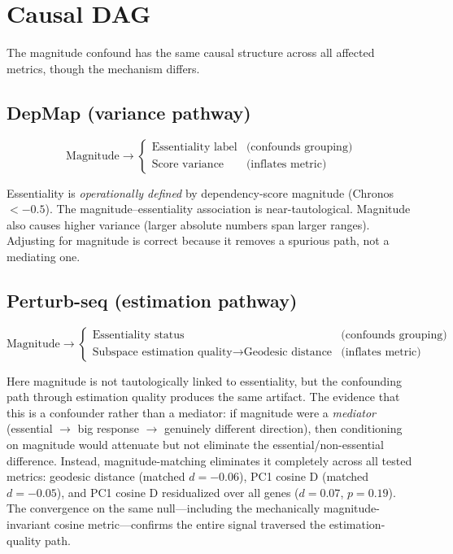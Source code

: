 \documentclass[11pt]{article}
\begin{document}
\section{Causal DAG}
\label{sec:dag}

The magnitude confound has the same causal structure across all
affected metrics, though the mechanism differs.

\subsection{DepMap (variance pathway)}

\begin{equation*}
\text{Magnitude} \rightarrow
\begin{cases}
\text{Essentiality label} & \text{(confounds grouping)} \\
\text{Score variance} & \text{(inflates metric)}
\end{cases}
\end{equation*}

Essentiality is \emph{operationally defined} by dependency-score
magnitude (Chronos $< -0.5$). The magnitude--essentiality association is
near-tautological. Magnitude also causes higher variance (larger
absolute numbers span larger ranges). Adjusting for magnitude is correct
because it removes a spurious path, not a mediating one.

\subsection{Perturb-seq (estimation pathway)}

\begin{equation*}
\text{Magnitude} \rightarrow
\begin{cases}
\text{Essentiality status} & \text{(confounds grouping)} \\
\text{Subspace estimation quality} \rightarrow \text{Geodesic distance}
  & \text{(inflates metric)}
\end{cases}
\end{equation*}

Here magnitude is not tautologically linked to essentiality, but the
confounding path through estimation quality produces the same artifact.
The evidence that this is a confounder rather than a mediator: if
magnitude were a \emph{mediator} (essential $\rightarrow$ big response
$\rightarrow$ genuinely different direction), then conditioning on
magnitude would attenuate but not eliminate the essential/non-essential
difference. Instead, magnitude-matching eliminates it completely across all tested
metrics: geodesic distance (matched $d = -0.06$), PC1 cosine D (matched
$d = -0.05$), and PC1 cosine D residualized over all genes ($d = 0.07$,
$p = 0.19$). The convergence on the same null---including the
mechanically magnitude-invariant cosine metric---confirms the entire
signal traversed the estimation-quality path.
\end{document}
